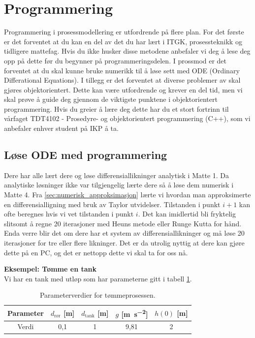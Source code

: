 \clearpage
\section{Programmering}\label{sec:prog}
Programmering i prosessmodellering er utfordrende på flere plan. For det første er det forventet at du kan en del av det du har lært i ITGK, prosessteknikk og tidligere mattefag. Hvis du ikke husker disse metodene anbefaler vi deg å lese deg opp på dette før du begynner på programmeringsdelen. I prossmod er det forventet at du skal kunne bruke numerikk til å løse sett med ODE (Ordinary Differational Equations). I tillegg er det forventet at diverse problemer av skal gjøres objektorientert. Dette kan være utfordrende og krever en del tid, men vi skal prøve å guide deg gjennom de viktigste punktene i objektorientert programmering. Hvis du greier å lære deg dette har du et stort fortrinn til vårfaget TDT4102 - Prosedyre- og objektorientert programmering (C++), som vi anbefaler enhver student på IKP å ta.

\subsection{Løse ODE med programmering}
 
 Dere har alle lært dere og løse differensiallikninger analytisk i Matte 1. Da analytiske løsninger ikke var tilgjengelig lærte dere så å løse dem numerisk i Matte 4. Fra \cref{sec:numerisk_approksimasjon} lærte vi hvordan man approksimerte en differensialligning med bruk av Taylor utvidelser. Tilstanden i punkt $i+1$ kan ofte beregnes hvis vi vet tilstanden i punkt $i$. Det kan imidlertid bli fryktelig slitsomt å regne 20 iterasjoner med Heuns metode eller Runge Kutta for hånd. Enda verre blir det om dere har et system av differensiallikninger og må løse 20 iterasjoner for tre eller flere likninger. Det er da utrolig nyttig at dere kan gjøre dette på en PC, og det er nettopp dette vi skal ta for oss nå.
\newpage

\textbf{Eksempel: Tømme en tank}\\
Vi har en tank med utløp som har parameterne gitt i tabell \cref{tab:tank_parameters}. 
\begin{table}[h]
    \centering
    \caption{Parameterverdier for tømmeprosessen.}
    \begin{tabular}{ccccc}
    \toprule
        Parameter & $d_\text{rør}$ [\si{\meter}] & $d_\text{tank}$ 
        [\si{\meter}] & $g$ [\si{\meter\per\square\second}] & $h(0)$ [\si{\meter}]\\
    \midrule
        Verdi       & 0,1 & 1 & 9,81 & 2\\
    \bottomrule
    \end{tabular}
    \label{tab:tank_parameters}
\end{table}

